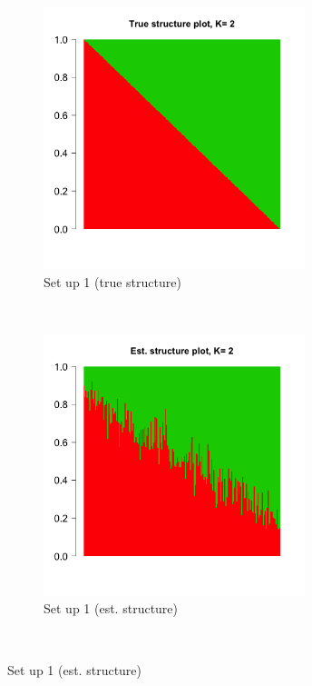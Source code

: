 \begin{figure}[ht]
    \centering
    \begin{subfigure}[t]{0.5\textwidth}
        \centering
        \includegraphics[height=3in]{../plots/true_structure_setup_1.png}
        \caption{Set up 1 (true structure)}
    \end{subfigure}%
    ~ 
    \begin{subfigure}[t]{0.5\textwidth}
        \centering
        \includegraphics[height=3in]{../plots/est_structure_setup_1.png}
        \caption{Set up 1 (est. structure)}
    \end{subfigure}   \\
    

\end{figure}
